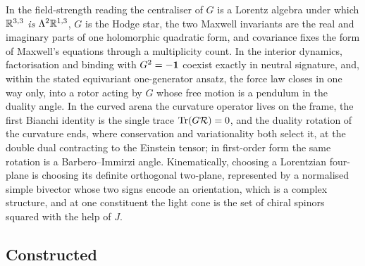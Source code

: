 In the field-strength reading the centraliser of $G$ is a Lorentz algebra under which $\mathbb{R}^{3,3}$ \emph{is} $\Lambda^2\mathbb{R}^{1,3}$, $G$ is the Hodge star, the two Maxwell
invariants are the real and imaginary parts of one holomorphic quadratic form, and covariance fixes the form of Maxwell's equations through a multiplicity count. In the
interior dynamics, factorisation and binding with $G^2=-\mathbf 1$ coexist exactly in neutral signature, and, within the stated equivariant one-generator ansatz, the force law closes in one way only, into a rotor acting by $G$ whose free motion is a
pendulum in the duality angle. In the curved arena the curvature operator lives on the frame, the first Bianchi identity is the single trace $\operatorname{Tr}(G\mathcal R)=0$, and the duality
rotation of the curvature ends, where conservation and variationality both select it, at the double dual contracting to the Einstein tensor; in first-order form the same
rotation is a Barbero--Immirzi angle. Kinematically, choosing a Lorentzian four-plane is choosing its definite orthogonal two-plane, represented by a normalised simple bivector
whose two signs encode an orientation, which is a complex structure, and at one constituent the light cone is the set of
chiral spinors squared with the help of $J$.

\subsection{Constructed}

